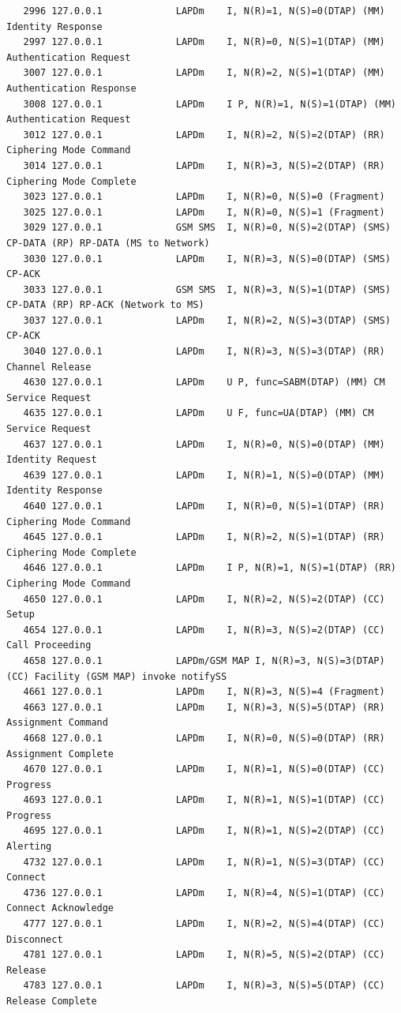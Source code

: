 \begin{lstlisting}
   2996 127.0.0.1             LAPDm    I, N(R)=1, N(S)=0(DTAP) (MM) Identity Response 
   2997 127.0.0.1             LAPDm    I, N(R)=0, N(S)=1(DTAP) (MM) Authentication Request 
   3007 127.0.0.1             LAPDm    I, N(R)=2, N(S)=1(DTAP) (MM) Authentication Response 
   3008 127.0.0.1             LAPDm    I P, N(R)=1, N(S)=1(DTAP) (MM) Authentication Request 
   3012 127.0.0.1             LAPDm    I, N(R)=2, N(S)=2(DTAP) (RR) Ciphering Mode Command 
   3014 127.0.0.1             LAPDm    I, N(R)=3, N(S)=2(DTAP) (RR) Ciphering Mode Complete 
   3023 127.0.0.1             LAPDm    I, N(R)=0, N(S)=0 (Fragment)
   3025 127.0.0.1             LAPDm    I, N(R)=0, N(S)=1 (Fragment)
   3029 127.0.0.1             GSM SMS  I, N(R)=0, N(S)=2(DTAP) (SMS) CP-DATA (RP) RP-DATA (MS to Network) 
   3030 127.0.0.1             LAPDm    I, N(R)=3, N(S)=0(DTAP) (SMS) CP-ACK 
   3033 127.0.0.1             GSM SMS  I, N(R)=3, N(S)=1(DTAP) (SMS) CP-DATA (RP) RP-ACK (Network to MS) 
   3037 127.0.0.1             LAPDm    I, N(R)=2, N(S)=3(DTAP) (SMS) CP-ACK 
   3040 127.0.0.1             LAPDm    I, N(R)=3, N(S)=3(DTAP) (RR) Channel Release 
   4630 127.0.0.1             LAPDm    U P, func=SABM(DTAP) (MM) CM Service Request 
   4635 127.0.0.1             LAPDm    U F, func=UA(DTAP) (MM) CM Service Request 
   4637 127.0.0.1             LAPDm    I, N(R)=0, N(S)=0(DTAP) (MM) Identity Request 
   4639 127.0.0.1             LAPDm    I, N(R)=1, N(S)=0(DTAP) (MM) Identity Response 
   4640 127.0.0.1             LAPDm    I, N(R)=0, N(S)=1(DTAP) (RR) Ciphering Mode Command 
   4645 127.0.0.1             LAPDm    I, N(R)=2, N(S)=1(DTAP) (RR) Ciphering Mode Complete 
   4646 127.0.0.1             LAPDm    I P, N(R)=1, N(S)=1(DTAP) (RR) Ciphering Mode Command 
   4650 127.0.0.1             LAPDm    I, N(R)=2, N(S)=2(DTAP) (CC) Setup 
   4654 127.0.0.1             LAPDm    I, N(R)=3, N(S)=2(DTAP) (CC) Call Proceeding 
   4658 127.0.0.1             LAPDm/GSM MAP I, N(R)=3, N(S)=3(DTAP) (CC) Facility (GSM MAP) invoke notifySS 
   4661 127.0.0.1             LAPDm    I, N(R)=3, N(S)=4 (Fragment)
   4663 127.0.0.1             LAPDm    I, N(R)=3, N(S)=5(DTAP) (RR) Assignment Command 
   4668 127.0.0.1             LAPDm    I, N(R)=0, N(S)=0(DTAP) (RR) Assignment Complete 
   4670 127.0.0.1             LAPDm    I, N(R)=1, N(S)=0(DTAP) (CC) Progress 
   4693 127.0.0.1             LAPDm    I, N(R)=1, N(S)=1(DTAP) (CC) Progress 
   4695 127.0.0.1             LAPDm    I, N(R)=1, N(S)=2(DTAP) (CC) Alerting 
   4732 127.0.0.1             LAPDm    I, N(R)=1, N(S)=3(DTAP) (CC) Connect 
   4736 127.0.0.1             LAPDm    I, N(R)=4, N(S)=1(DTAP) (CC) Connect Acknowledge 
   4777 127.0.0.1             LAPDm    I, N(R)=2, N(S)=4(DTAP) (CC) Disconnect 
   4781 127.0.0.1             LAPDm    I, N(R)=5, N(S)=2(DTAP) (CC) Release 
   4783 127.0.0.1             LAPDm    I, N(R)=3, N(S)=5(DTAP) (CC) Release Complete 
\end{lstlisting}

